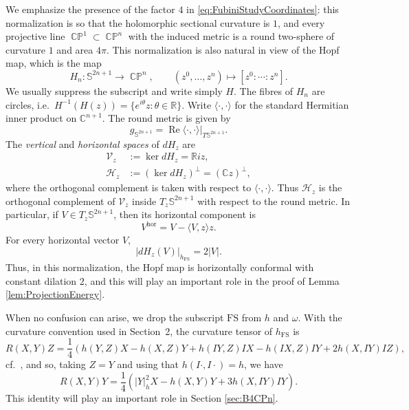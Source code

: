 \documentclass[11pt]{article}
\theoremstyle{plain}
\numberwithin{equation}{section}
\theoremstyle{definition}
\def \R {\mathbb{R}}
\def \C{\mathbb{C}}
\def \mc{\mathcal}
\def \mb{\mathbb}
\def \FS{\mathrm{FS}}
\DeclareMathOperator{\CP}{\mathbb{CP}}
\begin{document}
We emphasize the presence of the factor $4$ in \eqref{eq:FubiniStudyCoordinates}: this normalization is so that 
the holomorphic sectional curvature is $1$, and every projective line $\CP^1\subset \CP^n$ with
the induced metric is a round two-sphere of curvature $1$ and area $4\pi$.
This normalization is also natural in view of the Hopf map, which  is the map
\[
    H_n\colon\mb S^{2n+1}\longrightarrow\CP^n,
    \qquad
    (z^0, \dots, z^n)\mapsto [z^0:\cdots:z^n].
\]
We usually suppress the subscript and write simply $H$.  The fibres of $H_n$ are circles, i.e.\
$    H^{-1}(H(z))=\{e^{i\theta}z:\theta\in\R\}.$
Write $\langle\cdot,\cdot\rangle$ for the standard Hermitian inner
product on $\C^{n+1}$.  The round metric is given by
\begin{equation}
    \label{eq:RoundMetricHermitianProduct}
    g_{\mb S^{2n+1}}
    =\left.\operatorname{Re}\langle\cdot,\cdot\rangle
      \right|_{T\mb S^{2n+1}}.
\end{equation}
The \textit{vertical} and \textit{horizontal spaces} of $dH_z$ are
\begin{equation}
    \label{eq:HopfVerticalHorizontal}
    \begin{aligned}
        \mc V_z&:=\ker dH_z=\R iz,\\
        \mc H_z&:=(\ker dH_z)^\perp=(\C z)^\perp,
    \end{aligned}
\end{equation}
where the orthogonal complement is taken with respect to $\langle\cdot, \cdot\rangle$.
Thus $\mc H_z$ is the orthogonal complement of $\mc V_z$ inside
$T_z\mb S^{2n+1}$ with respect to the round metric.  In particular,
if $V\in T_z\mb S^{2n+1}$, then its horizontal component is
\begin{equation}
    \label{eq:HopfHorizontalProjection}
    V^{\mathrm{hor}}=V-\langle V,z\rangle z.
\end{equation}
For every horizontal vector $V$,
\begin{equation}
    \label{eq:HopfDilation}
    |dH_z(V)|_{h_\FS}=2|V|.
\end{equation}
Thus, in this normalization, the Hopf map is horizontally conformal with constant dilation $2$, and this will play an important role in the proof of Lemma \ref{lem:ProjectionEnergy}.

When no confusion can arise, we drop the subscript $\FS$ from $h$ and
$\omega$.  With the curvature convention used in Section~2, the
curvature tensor of $h_\FS$ is
$$
R(X,Y)Z= \frac 1 4\left(h(Y,Z)X-h(X,Z)Y+ h(IY,Z) IX - h(IX,Z)IY + 2 h(X,IY)IZ\right),
$$
cf.\ \cite[(1)]{Chen1996},
and so, taking $Z=Y$ and using that $h(I\cdot,I\cdot)=h$, we have
\begin{equation}
\label{eq:curvsimple}
R(X,Y)Y=\frac 1 4 \left(|Y|_h^2 X-h(X,Y) Y + 3 h(X,IY) IY\right).
\end{equation}
This identity will play an important role in Section \ref{sec:B4CPn}.
\end{document}
